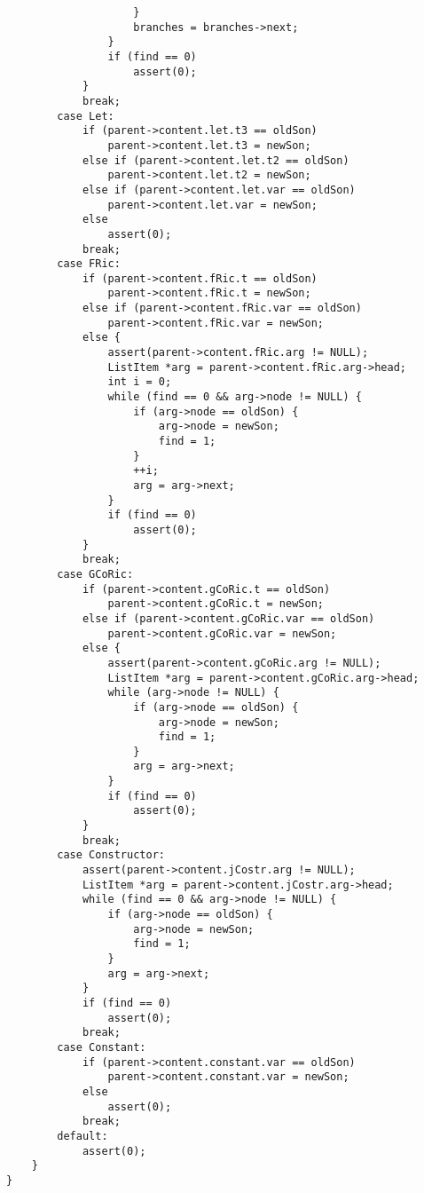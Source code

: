 \documentclass[12pt,a4paper,openright,twoside]{report}
\begin{document}
\begin{verbatim}
                    }
                    branches = branches->next;
                }
                if (find == 0)
                    assert(0);
            }
            break;
        case Let:
            if (parent->content.let.t3 == oldSon)
                parent->content.let.t3 = newSon;
            else if (parent->content.let.t2 == oldSon)
                parent->content.let.t2 = newSon;
            else if (parent->content.let.var == oldSon)
                parent->content.let.var = newSon;
            else
                assert(0);
            break;
        case FRic:
            if (parent->content.fRic.t == oldSon)
                parent->content.fRic.t = newSon;
            else if (parent->content.fRic.var == oldSon)
                parent->content.fRic.var = newSon;
            else {
                assert(parent->content.fRic.arg != NULL);
                ListItem *arg = parent->content.fRic.arg->head;
                int i = 0;
                while (find == 0 && arg->node != NULL) {
                    if (arg->node == oldSon) {
                        arg->node = newSon;
                        find = 1;
                    }
                    ++i;
                    arg = arg->next;
                }
                if (find == 0)
                    assert(0);
            }
            break;
        case GCoRic:
            if (parent->content.gCoRic.t == oldSon)
                parent->content.gCoRic.t = newSon;
            else if (parent->content.gCoRic.var == oldSon)
                parent->content.gCoRic.var = newSon;
            else {
                assert(parent->content.gCoRic.arg != NULL);
                ListItem *arg = parent->content.gCoRic.arg->head;
                while (arg->node != NULL) {
                    if (arg->node == oldSon) {
                        arg->node = newSon;
                        find = 1;
                    }
                    arg = arg->next;
                }
                if (find == 0)
                    assert(0);
            }
            break;
        case Constructor:
            assert(parent->content.jCostr.arg != NULL);
            ListItem *arg = parent->content.jCostr.arg->head;
            while (find == 0 && arg->node != NULL) {
                if (arg->node == oldSon) {
                    arg->node = newSon;
                    find = 1;
                }
                arg = arg->next;
            }
            if (find == 0)
                assert(0);
            break;
        case Constant:
            if (parent->content.constant.var == oldSon)
                parent->content.constant.var = newSon;
            else
                assert(0);
            break;
        default:
            assert(0);
    }
}


\end{verbatim}
\end{document}
